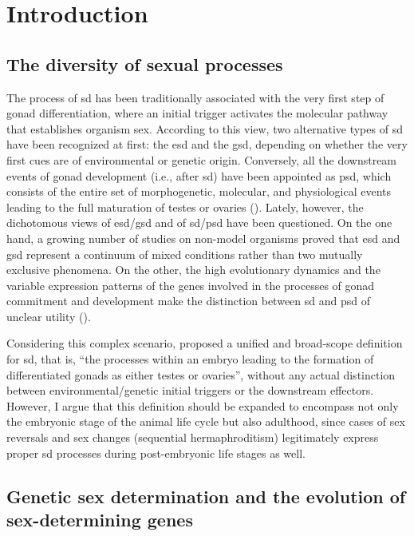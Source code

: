 \documentclass[../main.tex]{subfiles}
\begin{document}
{
\chapter{Introduction}
\label{introduction}
}

\section{The diversity of sexual processes}
The process of \gls{sd} has been traditionally associated with the very first step of gonad differentiation, where an initial trigger activates the molecular pathway that establishes organism sex. According to this view, two alternative types of \gls{sd} have been recognized at first: the \gls{esd} and the \gls{gsd}, depending on whether the very first cues are of environmental or genetic origin. Conversely, all the downstream events of gonad development (i.e., after \gls{sd}) have been appointed as \gls{psd}, which consists of the entire set of morphogenetic, molecular, and physiological events leading to the full maturation of testes or ovaries (\textbf{\cite{uller2011origin, beukeboom2014evolution}}). Lately, however, the dichotomous views of \gls{esd}/\gls{gsd} and of \gls{sd}/\gls{psd} have been questioned. On the one hand, a growing number of studies on non-model organisms proved that \gls{esd} and \gls{gsd} represent a continuum of mixed conditions rather than two mutually exclusive phenomena. On the other, the high evolutionary dynamics and the variable expression patterns of the genes involved in the processes of gonad commitment and development make the distinction between \gls{sd} and \gls{psd} of unclear utility (\textbf{\cite{beukeboom2014evolution}}).

Considering this complex scenario, \textbf{\cite{uller2011origin}} proposed a unified and broad-scope definition for \gls{sd}, that is, “the processes within an embryo leading to the formation of differentiated gonads as either testes or ovaries”, without any actual distinction between environmental/genetic initial triggers or the downstream effectors. However, I argue that this definition should be expanded to encompass not only the embryonic stage of the animal life cycle but also adulthood, since cases of sex reversals and sex changes (sequential hermaphroditism) legitimately express proper \gls{sd} processes during post-embryonic life stages as well.

\section{Genetic sex determination and the evolution of sex-determining genes}
\end{document}
